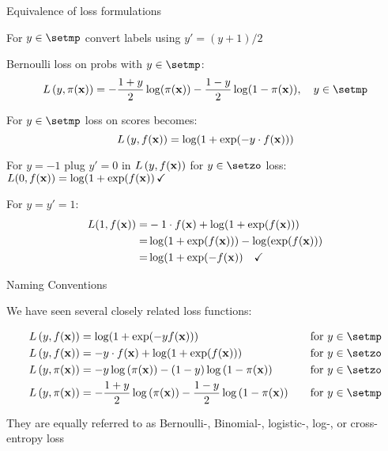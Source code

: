\documentclass[11pt,compress,t,notes=noshow, xcolor=table]{beamer}
\begin{document}
\begin{frame2}[small]{Equivalence of loss formulations}

\begin{itemizeM}
\item For $y \in \setmp$ convert labels using $y'=(y+1)/2$ %

\item Bernoulli loss on probs with $y \in \setmp$: 
$$
\Lpixy  = - \frac{1 + y}{2} \log(\pix) - \frac{1 - y}{2} \log(1 - \pix), \quad y \in \setmp 
$$

\item For $y \in \setmp$ loss on scores becomes: 
$$
L\left(y, f(\mathbf{x})\right) = \log(1+\exp(-y \cdot f(\mathbf{x}))) 
$$
\item For $y=-1$ plug $y'=0$ in  $L\left(y, f(\mathbf{x})\right)$ for $y \in \setzo$ loss: $L(0,f(\mathbf{x}))=\log(1+\exp(f(\mathbf{x})) \, \checkmark$
\item For $y=y'=1$: 
\begin{align*}
L(1,f(\mathbf{x}))=&-1 \cdot f(\mathbf{x})+\log(1+\exp(f(\mathbf{x})))\\
=&\log(1+\exp(f(\mathbf{x})))-\log(\exp(f(\mathbf{x})))\\
=&\log(1+\exp(-f(\mathbf{x})) \quad \checkmark
\end{align*}
\end{itemizeM}

\end{frame2}

\begin{vbframe}{Naming Conventions}

We have seen several closely related loss functions: 

\begin{alignat*}{3} \Lxy    &= \log(1+\exp(-y\fx)) &&\quad \text{for } y \in \setmp \\ \Lxy    &= - y \cdot \fx + \log(1 + \exp(\fx)) &&\quad \text{for } y \in \setzo \\ \Lpixy  &= - y \log \left(\pix\right) - (1 - y) \log \left(1 - \pix\right) &&\quad \text{for } y \in \setzo \\ \Lpixy  &= - \frac{1 + y}{2} \log\left(\pix\right) - \frac{1 - y}{2} \log\left(1 - \pix\right) &&\quad \text{for } y \in \setmp \end{alignat*}

\vfill

They are equally referred to as Bernoulli-, Binomial-, logistic-, log-, or cross-entropy loss

\end{vbframe}
\end{document}
